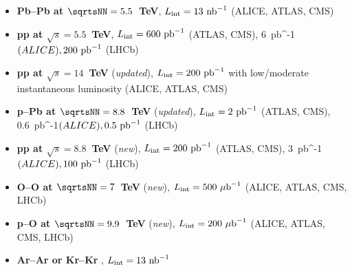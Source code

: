 \documentclass[../report.tex]{subfiles}
\begin{document}
\begin{itemize}

\item {\bf Pb--Pb at $\sqrtsNN=5.5$~TeV}, $L_{\rm int}=13~{\rm nb}^{-1}$ (ALICE, ATLAS, CMS)

\item {\bf pp at $\sqrt s=5.5$~TeV}, $L_{\rm int}=600~{\rm pb}^{-1}$ (ATLAS, CMS), 6~{\rm pb}^{-1}$ (ALICE),  200~{\rm pb}^{-1}$ (LHCb) 

\item {\bf pp at $\sqrt s=14$~TeV} ({\it updated}), $L_{\rm int}=200~{\rm pb}^{-1}$ with low/moderate instantaneous luminosity (ALICE, ATLAS, CMS)

\item {\bf p--Pb at $\sqrtsNN=8.8$~TeV}  ({\it updated}), $L_{\rm int}=2~{\rm pb}^{-1}$ (ATLAS, CMS), 0.6~{\rm pb}^{-1}$ (ALICE),  0.5~{\rm pb}^{-1}$ (LHCb) 

\item {\bf pp at $\sqrt s=8.8$~TeV}  ({\it new}), $L_{\rm int}=200~{\rm pb}^{-1}$ (ATLAS, CMS), 3~{\rm pb}^{-1}$ (ALICE),  100~{\rm pb}^{-1}$ (LHCb) 

\item {\bf O--O at $\sqrtsNN=7$~TeV} ({\it new}), $L_{\rm int}=500~{\rm \mu b}^{-1}$ (ALICE, ATLAS, CMS, LHCb)

\item {\bf p--O at $\sqrtsNN=9.9$~TeV} ({\it new}), $L_{\rm int}=200~{\rm \mu b}^{-1}$ (ALICE, ATLAS, CMS, LHCb)

\item {\bf Ar--Ar or Kr--Kr} , $L_{\rm int}=13~{\rm nb}^{-1}$

\end{itemize}
\end{document}
